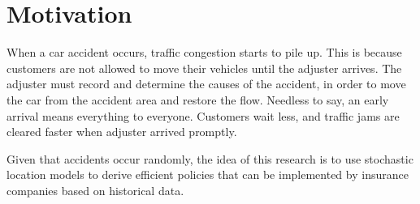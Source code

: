 \section{Motivation}
When a car accident occurs,
traffic congestion starts to pile up.
This is because
customers are not allowed
to move their vehicles until
the adjuster arrives.
The adjuster must record and determine
the causes of the accident,
in order to
move the car from the accident area
and restore the flow.
Needless to say,
an early arrival
means everything to everyone.
Customers wait less,
and traffic jams
are cleared faster
when adjuster arrived promptly.

Given that accidents occur randomly,
the idea of this research
is to use stochastic location models
to derive efficient policies
that can be implemented
by insurance companies
based on historical data.
